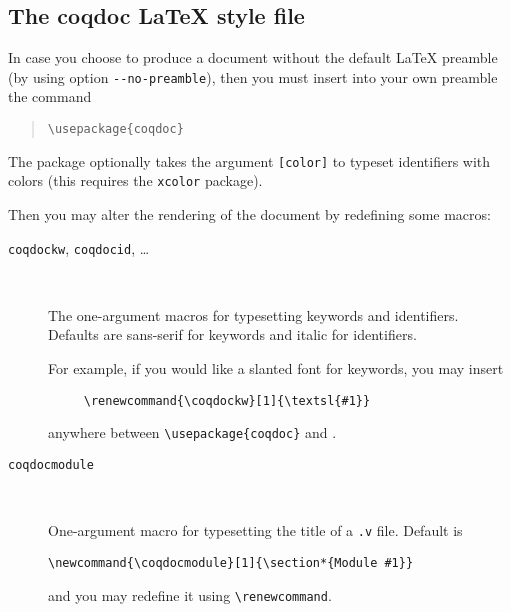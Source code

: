 \subsection[The coqdoc \LaTeX{} style file]{The coqdoc \LaTeX{} style file\label{section:coqdoc.sty}}

In case you choose to produce a document without the default \LaTeX{}
preamble (by using option \verb|--no-preamble|), then you must insert
into your own preamble the command
\begin{quote}
  \verb|\usepackage{coqdoc}|
\end{quote}

The package optionally takes the argument \verb|[color]| to typeset
identifiers with colors (this requires the \verb|xcolor| package).

Then you may alter the rendering of the document by
redefining some macros:
\begin{description}

\item[\texttt{coqdockw}, \texttt{coqdocid}, \ldots] ~ 
  
  The one-argument macros for typesetting keywords and identifiers.
  Defaults are sans-serif for keywords and italic for identifiers.

  For example, if you would like a slanted font for keywords, you
  may insert  
\begin{verbatim}
     \renewcommand{\coqdockw}[1]{\textsl{#1}}
\end{verbatim}
  anywhere between \verb|\usepackage{coqdoc}| and
  \verb||. 

\item[\texttt{coqdocmodule}] ~ 
  
  One-argument macro for typesetting the title of a \verb|.v| file.
  Default is
\begin{verbatim}
\newcommand{\coqdocmodule}[1]{\section*{Module #1}}
\end{verbatim}
  and you may redefine it using \verb|\renewcommand|.

\end{description}



